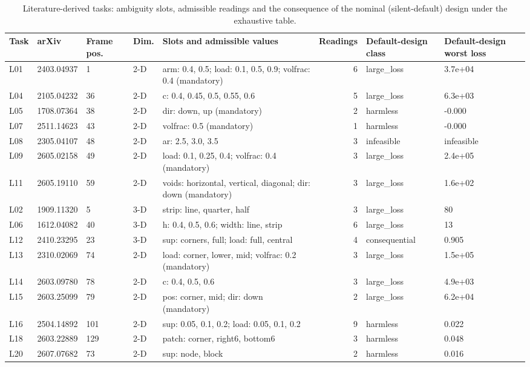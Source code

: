 \begin{table}[t]
\centering\small
\caption{Literature-derived tasks: ambiguity slots, admissible readings and the consequence of the nominal (silent-default) design under the exhaustive table.}
\label{tab:tab_tasks}
\begin{tabular}{lllllrll}
\toprule
Task & arXiv & Frame pos. & Dim. & Slots and admissible values & Readings & Default-design class & Default-design worst loss \\
\midrule
L01 & 2403.04937 & 1 & 2-D & arm: 0.4, 0.5; load: 0.1, 0.5, 0.9; volfrac: 0.4 (mandatory) & 6 & large\_loss & 3.7e+04 \\
L04 & 2105.04232 & 36 & 2-D & c: 0.4, 0.45, 0.5, 0.55, 0.6 & 5 & large\_loss & 6.3e+03 \\
L05 & 1708.07364 & 38 & 2-D & dir: down, up (mandatory) & 2 & harmless & -0.000 \\
L07 & 2511.14623 & 43 & 2-D & volfrac: 0.5 (mandatory) & 1 & harmless & -0.000 \\
L08 & 2305.04107 & 48 & 2-D & ar: 2.5, 3.0, 3.5 & 3 & infeasible & infeasible \\
L09 & 2605.02158 & 49 & 2-D & load: 0.1, 0.25, 0.4; volfrac: 0.4 (mandatory) & 3 & large\_loss & 2.4e+05 \\
L11 & 2605.19110 & 59 & 2-D & voids: horizontal, vertical, diagonal; dir: down (mandatory) & 3 & large\_loss & 1.6e+02 \\
L02 & 1909.11320 & 5 & 3-D & strip: line, quarter, half & 3 & large\_loss & 80 \\
L06 & 1612.04082 & 40 & 3-D & h: 0.4, 0.5, 0.6; width: line, strip & 6 & large\_loss & 13 \\
L12 & 2410.23295 & 23 & 3-D & sup: corners, full; load: full, central & 4 & consequential & 0.905 \\
L13 & 2310.02069 & 74 & 2-D & load: corner, lower, mid; volfrac: 0.2 (mandatory) & 3 & large\_loss & 1.5e+05 \\
L14 & 2603.09780 & 78 & 2-D & c: 0.4, 0.5, 0.6 & 3 & large\_loss & 4.9e+03 \\
L15 & 2603.25099 & 79 & 2-D & pos: corner, mid; dir: down (mandatory) & 2 & large\_loss & 6.2e+04 \\
L16 & 2504.14892 & 101 & 2-D & sup: 0.05, 0.1, 0.2; load: 0.05, 0.1, 0.2 & 9 & harmless & 0.022 \\
L18 & 2603.22889 & 129 & 2-D & patch: corner, right6, bottom6 & 3 & harmless & 0.048 \\
L20 & 2607.07682 & 73 & 2-D & sup: node, block & 2 & harmless & 0.016 \\

\end{tabular}
\end{table}
